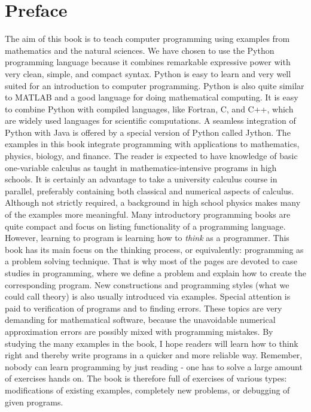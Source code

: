 \documentclass[graybox,sectrefs,envcountresetchap,open=right,final]{svmonodo}
\begin{document}
\chapter*{Preface}
The aim of this book is to teach computer programming using examples
from mathematics and the natural sciences.  We have chosen to use the
Python programming language because it combines remarkable expressive
power with very clean, simple, and compact syntax.  Python is easy to
learn and very well suited for an introduction to computer
programming. Python is also quite similar to MATLAB and a good
language for doing mathematical computing.  It is easy to combine
Python with compiled languages, like Fortran, C, and C++, which are
widely used languages for scientific computations.  A seamless
integration of Python with Java is offered by a special version of
Python called Jython.
The examples in this book integrate programming with applications to
mathematics, physics, biology, and finance.  The reader is expected to
have knowledge of basic one-variable calculus as taught in
mathematics-intensive programs in high schools. It is certainly an
advantage to take a university calculus course in parallel, preferably
containing both classical and numerical aspects of calculus.  Although
not strictly required, a background in high school physics makes many
of the examples more meaningful.
Many introductory programming books are quite compact and focus on
listing functionality of a programming language. However, learning to
program is learning how to \emph{think} as a programmer.  This book
has its main focus on the thinking process, or equivalently:
programming as a problem solving technique. That is why most of the
pages are devoted to case studies in programming, where we define a
problem and explain how to create the corresponding program.  New
constructions and programming styles (what we could call theory) is also usually
introduced via examples.  Special attention is paid to verification of
programs and to finding errors. These topics are very demanding for
mathematical software, because the unavoidable numerical
approximation errors are possibly mixed with programming mistakes.
By studying the many examples in the
book, I hope readers will learn how to think right and thereby
write programs in a quicker and more reliable way. Remember, nobody can learn
programming by just reading - one has to solve a large amount of
exercises hands on.  The book is therefore full of exercises of
various types: modifications of existing examples, completely new
problems, or debugging of given programs.
\end{document}
